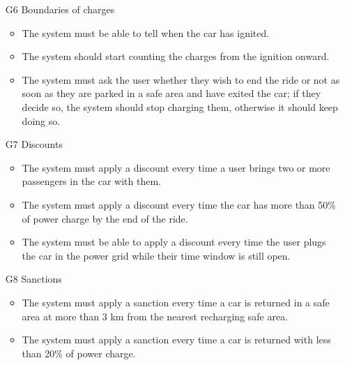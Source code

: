 \begin{itemize}
				\item [G6] Boundaries of charges %
					\begin{itemize}
						\item The system must be able to tell when the car has ignited. 
						\item The system should start counting the charges from the ignition onward. %
						\item The system must ask the user whether they wish to end the ride or not as soon as they are parked in a safe area and have exited the car; if they decide so, the system should stop charging them, otherwise it should keep doing so. 
					\end{itemize}
					
				\item [G7] Discounts 
					\begin{itemize}
						\item The system must apply a discount every time a user brings two or more passengers in the car with them.
						\item The system must apply a discount every time the car has more than 50\% of power charge by the end of the ride. %
						\item The system must be able to apply a discount every time the user plugs the car in the power grid while their time window is still open.
					\end{itemize}
					
				\item [G8] Sanctions
					\begin{itemize}
						\item The system must apply a sanction every time a car is returned in a safe area at more than 3 km from the nearest recharging safe area.
						\item The system must apply a sanction every time a car is returned with less than 20\% of power charge.
					\end{itemize}
					

\end{itemize}
